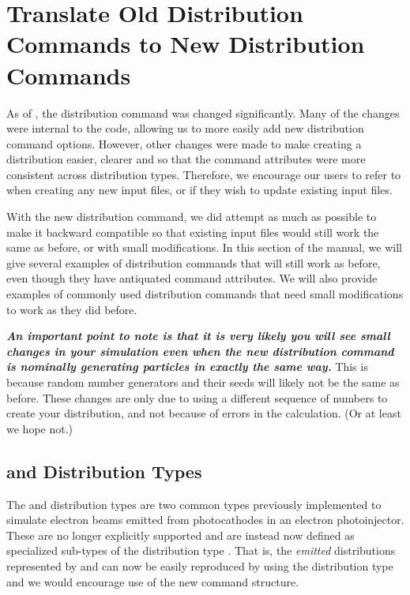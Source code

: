 \clearpage


\section{Translate Old Distribution Commands to New Distribution Commands}
\label{sec:oldtonewdist}
As of , the distribution command  was changed significantly. Many of the changes were internal to the code, allowing us to more easily add new distribution command options. However, other changes were made to make creating a distribution easier, clearer and so that the command attributes were more consistent across distribution types. Therefore, we encourage our users to refer to  when creating any new input files, or if they wish to update existing input files.

With the new distribution command, we did attempt as much as possible to make it backward compatible so that existing \opal input files would still work the same as before, or with small modifications. In this section of the manual, we will give several examples of distribution commands that will still work as before, even though they have antiquated command attributes. We will also provide examples of commonly used distribution commands that need small modifications to work as they did before.

\textbf{\emph{An important point to note is that it is very likely you will see small changes in your simulation even when the new distribution command is nominally generating particles in exactly the same way.}} This is because random number generators and their seeds will likely not be the same as before. These changes are only due to \opal using a different sequence of numbers to create your distribution, and not because of errors in the calculation. (Or at least we hope not.)

\subsection{ and  Distribution Types}
\label{sec:oldtonewdistgungaussandastra}
The  and  distribution types  are two common types previously implemented to simulate electron beams emitted from photocathodes in an electron photoinjector. These are no longer explicitly supported and are instead now defined as specialized sub-types of the distribution type . That is, the \emph{emitted} distributions represented by  and  can now be easily reproduced by using the  distribution type and we would encourage use of the new command structure.

